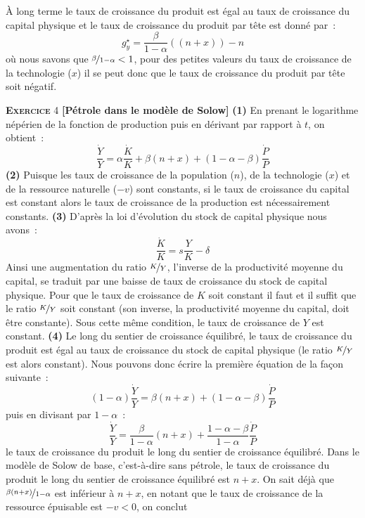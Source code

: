 \documentclass[10pt,a4paper,notitlepage,onecolumn]{article}
\newcommand{\exercice}[2]{\textsc{\textbf{Exercice}} #1 \textbf{[#2]}}
\newcommand{\question}[1]{\textbf{(#1)}}
\newcommand{\growth}[1]{\frac{\dot{#1}}{#1}}
\begin{document}
À long  terme le  taux de croissance  du produit est  égal au  taux de
croissance du capital physique et le taux de croissance du produit par
tête est donné par :
\[
g_y^{\star} = \frac{\beta}{1-\alpha}((n+x)) - n
\]
où nous  savons que  $\nicefrac{\beta}{1-\alpha}<1$, pour  des petites
valeurs du taux de croissance de  la technologie ($x$) il se peut donc
que  le  taux  de  croissance   du  produit  par  tête  soit  négatif.\newline

\bigskip

\exercice{4}{Pétrole dans le modèle  de Solow} \question{1} En prenant
le logarithme népérien  de la fonction de production  puis en dérivant
par rapport à $t$, on obtient :
\[
\growth{Y} = \alpha\growth{K} + \beta (n+x) + (1-\alpha-\beta)\growth{P}
\]
\question{2} Puisque les taux de croissance de la population ($n$), de
la  technologie  ($x$)  et  de  la  ressource  naturelle  ($-v$)  sont
constants, si le  taux de croissance du capital est  constant alors le
taux   de    croissance   de   la   production    est   nécessairement
constants. \question{3} D'après la loi d'évolution du stock de capital
physique nous avons :
\[
\growth{K} = s\frac{Y}{K} - \delta
\]
Ainsi  une augmentation  du ratio  $\nicefrac{K}{Y}$, l'inverse  de la
productivité moyenne du capital, se traduit  par une baisse de taux de
croissance  du  stock  de  capital  physique.  Pour  que  le  taux  de
croissance de  $K$ soit  constant il  faut et il  suffit que  le ratio
$\nicefrac{K}{Y}$ soit constant (son  inverse, la productivité moyenne
du capital, doit  être constante). Sous cette même  condition, le taux
de croissance de $Y$ est constant.  \question{4} Le long du sentier de
croissance équilibré,  le taux  de croissance du  produit est  égal au
taux  de   croissance  du   stock  de   capital  physique   (le  ratio
$\nicefrac{K}{Y}$  est alors  constant). Nous  pouvons donc  écrire la
première équation de la façon suivante :
\[
(1-\alpha)\growth{Y} = \beta (n+x) + (1-\alpha-\beta)\growth{P}
\]
puis en divisant par $1-\alpha$ :
\[
\growth{Y} = \frac{\beta}{1-\alpha} (n+x) + \frac{1-\alpha-\beta}{1-\alpha}\growth{P}
\]
le taux  de croissance  du produit  le long  du sentier  de croissance
équilibré. Dans le modèle de Solow de base, c'est-à-dire sans pétrole,
le taux  de croissance  du produit  le long  du sentier  de croissance
équilibré      est       $n+x$.       On      sait       déjà      que
$\nicefrac{\beta(n+x)}{1-\alpha}$ est inférieur à $n+x$, en notant que
le taux de croissance de la ressource épuisable est $-v<0$, on conclut
\end{document}
